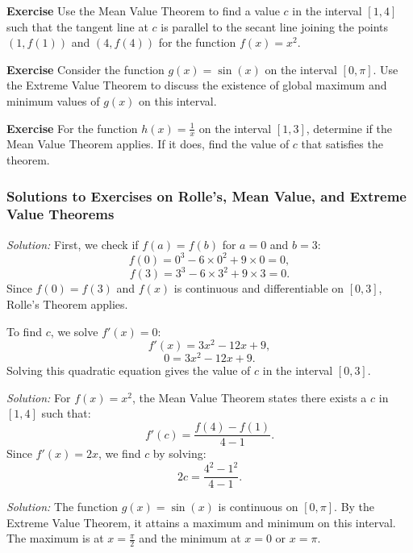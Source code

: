 \documentclass[a4paper,12pt]{book}
\newenvironment{exercise}[1][]
  {\par\medskip\noindent\textbf{Exercise #1} \rmfamily}
  {\medskip}
\newenvironment{solution}[1][]
{\par\noindent\textit{Solution:} \rmfamily}{\medskip}
\begin{document}
\begin{exercise}
Use the Mean Value Theorem to find a value \( c \) in the interval \([1, 4]\) such that the tangent line at \( c \) is parallel to the secant line joining the points \((1, f(1))\) and \((4, f(4))\) for the function \( f(x) = x^2 \).
\end{exercise}

\begin{exercise}
Consider the function \( g(x) = \sin(x) \) on the interval \([0, \pi]\). Use the Extreme Value Theorem to discuss the existence of global maximum and minimum values of \( g(x) \) on this interval.
\end{exercise}

\begin{exercise}
For the function \( h(x) = \frac{1}{x} \) on the interval \([1, 3]\), determine if the Mean Value Theorem applies. If it does, find the value of \( c \) that satisfies the theorem.
\end{exercise}

\subsubsection*{Solutions to Exercises on Rolle's, Mean Value, and Extreme Value Theorems}

\begin{solution}[to Exercise 1]
First, we check if \( f(a) = f(b) \) for \( a = 0 \) and \( b = 3 \):
\[ f(0) = 0^3 - 6 \times 0^2 + 9 \times 0 = 0, \]
\[ f(3) = 3^3 - 6 \times 3^2 + 9 \times 3 = 0. \]
Since \( f(0) = f(3) \) and \( f(x) \) is continuous and differentiable on \([0, 3]\), Rolle's Theorem applies. 

To find \( c \), we solve \( f'(x) = 0 \):
\[ f'(x) = 3x^2 - 12x + 9, \]
\[ 0 = 3x^2 - 12x + 9. \]
Solving this quadratic equation gives the value of \( c \) in the interval \([0, 3]\).
\end{solution}

\begin{solution}[to Exercise 2]
For \( f(x) = x^2 \), the Mean Value Theorem states there exists a \( c \) in \([1, 4]\) such that:
\[ f'(c) = \frac{f(4) - f(1)}{4 - 1}. \]
Since \( f'(x) = 2x \), we find \( c \) by solving:
\[ 2c = \frac{4^2 - 1^2}{4 - 1}. \]
\end{solution}

\begin{solution}[to Exercise 3]
The function \( g(x) = \sin(x) \) is continuous on \([0, \pi]\). By the Extreme Value Theorem, it attains a maximum and minimum on this interval. The maximum is at \( x = \frac{\pi}{2} \) and the minimum at \( x = 0 \) or \( x = \pi \).
\end{solution}
\end{document}
